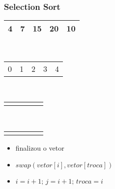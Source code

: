 \documentclass{beamer}
\begin{document}
\begin{frame}
    \frametitle{Selection Sort}
    \begin{center}
        \begin{table}
            \begin{tabular}{| p{0.25cm} | p{0.25cm} | p{0.25cm} | p{0.25cm} | p{0.25cm} |}
                \hline
                4 & 7 & 15 & 20 & 10 \\ \hline
            \end{tabular} \\
            \begin{tabular}{p{0.25cm} p{0.25cm} p{0.25cm} p{0.25cm} p{0.25cm}}
                0 & 1 & 2 & 3 & 4
            \end{tabular} \\
            \begin{tabular}{p{0.25cm} p{0.25cm} p{0.25cm} p{0.25cm} p{0.25cm}}
                 & & \color{blue}{$\uparrow$} & & \color{red}{$\uparrow$}
            \end{tabular} \\
            \begin{tabular}{p{0.25cm} p{0.25cm} p{0.25cm} p{0.25cm} p{0.25cm}}
                 & & \color{blue}{i} & & \color{red}{j}
            \end{tabular}
        \end{table}
	\end{center}
    \color{green}{$troca = 4$}
    \begin{itemize}[<+->]
        \item finalizou o vetor
        \item $swap(vetor[i], vetor[troca])$
        \item $i = i + 1$; $j = i + 1$; $troca = i$
    \end{itemize}
\end{frame}
\end{document}
